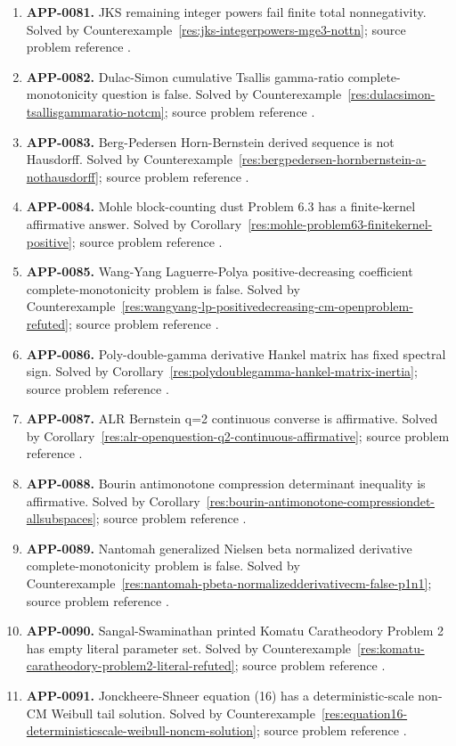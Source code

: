 \documentclass[11pt]{article}
\numberwithin{equation}{section}
\theoremstyle{definition}
\theoremstyle{remark}
\newcommand{\1}{\mathbf 1}
\begin{document}
\begin{enumerate}
\item \label{ledger:app-0081}\textbf{APP-0081.} JKS remaining integer powers fail finite total nonnegativity. Solved by Counterexample~\ref{res:jks-integerpowers-mge3-nottn}; source problem reference \cite{app-app-0065-source}.
\item \label{ledger:app-0082}\textbf{APP-0082.} Dulac-Simon cumulative Tsallis gamma-ratio complete-monotonicity question is false. Solved by Counterexample~\ref{res:dulacsimon-tsallisgammaratio-notcm}; source problem reference \cite{app-app-0082-source}.
\item \label{ledger:app-0083}\textbf{APP-0083.} Berg-Pedersen Horn-Bernstein derived sequence is not Hausdorff. Solved by Counterexample~\ref{res:bergpedersen-hornbernstein-a-nothausdorff}; source problem reference \cite{app-app-0083-source}.
\item \label{ledger:app-0084}\textbf{APP-0084.} Mohle block-counting dust Problem 6.3 has a finite-kernel affirmative answer. Solved by Corollary~\ref{res:mohle-problem63-finitekernel-positive}; source problem reference \cite{app-app-0084-source}.
\item \label{ledger:app-0085}\textbf{APP-0085.} Wang-Yang Laguerre-Polya positive-decreasing coefficient complete-monotonicity problem is false. Solved by Counterexample~\ref{res:wangyang-lp-positivedecreasing-cm-openproblem-refuted}; source problem reference \cite{app-app-0085-source}.
\item \label{ledger:app-0086}\textbf{APP-0086.} Poly-double-gamma derivative Hankel matrix has fixed spectral sign. Solved by Corollary~\ref{res:polydoublegamma-hankel-matrix-inertia}; source problem reference \cite{app-app-0086-source}.
\item \label{ledger:app-0087}\textbf{APP-0087.} ALR Bernstein q=2 continuous converse is affirmative. Solved by Corollary~\ref{res:alr-openquestion-q2-continuous-affirmative}; source problem reference \cite{app-app-0087-source}.
\item \label{ledger:app-0088}\textbf{APP-0088.} Bourin antimonotone compression determinant inequality is affirmative. Solved by Corollary~\ref{res:bourin-antimonotone-compressiondet-allsubspaces}; source problem reference \cite{app-app-0088-source}.
\item \label{ledger:app-0089}\textbf{APP-0089.} Nantomah generalized Nielsen beta normalized derivative complete-monotonicity problem is false. Solved by Counterexample~\ref{res:nantomah-pbeta-normalizedderivativecm-false-p1n1}; source problem reference \cite{app-app-0089-source}.
\item \label{ledger:app-0090}\textbf{APP-0090.} Sangal-Swaminathan printed Komatu Caratheodory Problem 2 has empty literal parameter set. Solved by Counterexample~\ref{res:komatu-caratheodory-problem2-literal-refuted}; source problem reference \cite{app-app-0090-source}.
\item \label{ledger:app-0091}\textbf{APP-0091.} Jonckheere-Shneer equation (16) has a deterministic-scale non-CM Weibull tail solution. Solved by Counterexample~\ref{res:equation16-deterministicscale-weibull-noncm-solution}; source problem reference \cite{app-app-0091-source}.
\end{enumerate}
\end{document}
